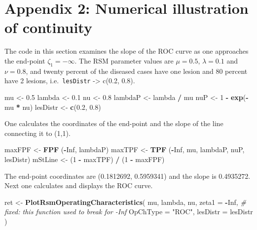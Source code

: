 \documentclass[
]{book}
\newenvironment{Shaded}{\begin{snugshade}}{\end{snugshade}}
\newcommand{\CommentTok}[1]{\textcolor[rgb]{0.56,0.35,0.01}{\textit{#1}}}
\newcommand{\DataTypeTok}[1]{\textcolor[rgb]{0.13,0.29,0.53}{#1}}
\newcommand{\DecValTok}[1]{\textcolor[rgb]{0.00,0.00,0.81}{#1}}
\newcommand{\FloatTok}[1]{\textcolor[rgb]{0.00,0.00,0.81}{#1}}
\newcommand{\KeywordTok}[1]{\textcolor[rgb]{0.13,0.29,0.53}{\textbf{#1}}}
\newcommand{\NormalTok}[1]{#1}
\newcommand{\OperatorTok}[1]{\textcolor[rgb]{0.81,0.36,0.00}{\textbf{#1}}}
\newcommand{\OtherTok}[1]{\textcolor[rgb]{0.56,0.35,0.01}{#1}}
\newcommand{\StringTok}[1]{\textcolor[rgb]{0.31,0.60,0.02}{#1}}
\begin{document}
\hypertarget{rsm-pred-appendix2}{%
\section{Appendix 2: Numerical illustration of continuity}\label{rsm-pred-appendix2}}

The code in this section examines the slope of the ROC curve as one approaches the end-point \(\zeta_1 = -\infty\). The RSM parameter values are \(\mu = 0.5\), \(\lambda = 0.1\) and \(\nu = 0.8\), and twenty percent of the diseased cases have one lesion and 80 percent have 2 lesions, i.e.~\texttt{lesDistr} -\textgreater{} c(0.2, 0.8).

\begin{Shaded}
\begin{Highlighting}[]
\NormalTok{mu <-}\StringTok{ }\FloatTok{0.5}
\NormalTok{lambda <-}\StringTok{ }\FloatTok{0.1}
\NormalTok{nu <-}\StringTok{ }\FloatTok{0.8}
\NormalTok{lambdaP <-}\StringTok{ }\NormalTok{lambda }\OperatorTok{/}\StringTok{ }\NormalTok{mu}
\NormalTok{nuP <-}\StringTok{ }\DecValTok{1} \OperatorTok{-}\StringTok{ }\KeywordTok{exp}\NormalTok{(}\OperatorTok{-}\NormalTok{mu }\OperatorTok{*}\StringTok{ }\NormalTok{nu)}
\NormalTok{lesDistr <-}\StringTok{ }\KeywordTok{c}\NormalTok{(}\FloatTok{0.2}\NormalTok{, }\FloatTok{0.8}\NormalTok{)}
\end{Highlighting}
\end{Shaded}

One calculates the coordinates of the end-point and the slope of the line connecting it to (1,1).

\begin{Shaded}
\begin{Highlighting}[]
\NormalTok{maxFPF <-}\StringTok{ }\KeywordTok{FPF}\NormalTok{ (}\OperatorTok{-}\OtherTok{Inf}\NormalTok{, lambdaP)}
\NormalTok{maxTPF <-}\StringTok{ }\KeywordTok{TPF}\NormalTok{ (}\OperatorTok{-}\OtherTok{Inf}\NormalTok{, mu, lambdaP, nuP, lesDistr)}
\NormalTok{mStLine <-}\StringTok{ }\NormalTok{(}\DecValTok{1} \OperatorTok{-}\StringTok{ }\NormalTok{maxTPF) }\OperatorTok{/}\StringTok{ }\NormalTok{(}\DecValTok{1} \OperatorTok{-}\StringTok{ }\NormalTok{maxFPF)}
\end{Highlighting}
\end{Shaded}

The end-point coordinates are (0.1812692, 0.5959341) and the slope is 0.4935272. Next one calculates and displays the ROC curve.

\begin{Shaded}
\begin{Highlighting}[]
\NormalTok{ret <-}\StringTok{ }\KeywordTok{PlotRsmOperatingCharacteristics}\NormalTok{(}
\NormalTok{  mu,}
\NormalTok{  lambda,}
\NormalTok{  nu,}
  \DataTypeTok{zeta1 =} \OperatorTok{-}\OtherTok{Inf}\NormalTok{, }\CommentTok{# fixed: this function used to break for -Inf}
  \DataTypeTok{OpChType =} \StringTok{"ROC"}\NormalTok{,}
  \DataTypeTok{lesDistr =}\NormalTok{ lesDistr}
\NormalTok{)}
\end{Highlighting}
\end{Shaded}
\end{document}

